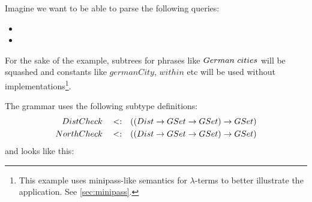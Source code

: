 \documentclass[main.tex]{subfiles}
\begin{document}
\begin{example}
    Imagine we want to be able to parse the following queries:
    \begin{itemize}
        \item {}
        \item {}
    \end{itemize}

    For the sake of the example, subtrees for phrases like $German \text{ } cities$
    will be squashed and constants like $germanCity$, $within$ etc will be
    used without implementations\footnote{
        This example uses minipass-like semantics for $\lambda$-terms to
        better illustrate the application. See \cref{sec:minipass}.
    }.

    The grammar uses the following subtype definitions:
    \begin{align*}
        DistCheck \quad<:\quad& ((Dist \rightarrow GSet \rightarrow GSet) \rightarrow GSet) \\
        NorthCheck \quad<:\quad& ((Dist \rightarrow GSet \rightarrow GSet) \rightarrow GSet) \\
    \end{align*}
    and looks like this:


\end{example}
\end{document}

